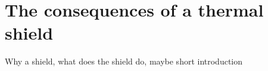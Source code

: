 \chapter{The consequences of a thermal shield}\label{cha:the-shield}

Why a shield, what does the shield do, maybe short introduction





